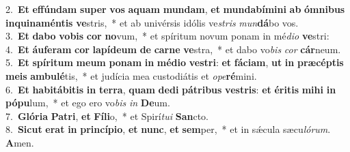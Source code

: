 {2.~}\textbf{Et} \textbf{ef}\textbf{fún}\textbf{dam} \textbf{su}\textbf{per} \textbf{vos} \textbf{a}\textbf{quam} \textbf{mun}\textbf{dam}, \textbf{et} \textbf{mun}\textbf{da}\textbf{bí}\textbf{mi}\textbf{ni} \textbf{ab} \textbf{óm}\textbf{ni}\textbf{bus} \textbf{in}\textbf{qui}\textbf{na}\textbf{mén}\textbf{tis} \textbf{ve}stris,~* et ab univérsis idólis ve\textit{stris} \textit{mun}\textbf{dá}bo vos.\\
{3.~}\textbf{Et} \textbf{da}\textbf{bo} \textbf{vo}\textbf{bis} \textbf{cor} \textbf{no}vum,~* et spíritum novum ponam in mé\textit{di}\textit{o} \textbf{ve}stri:\\
{4.~}\textbf{Et} \textbf{áu}\textbf{fe}\textbf{ram} \textbf{cor} \textbf{la}\textbf{pí}\textbf{de}\textbf{um} \textbf{de} \textbf{car}\textbf{ne} \textbf{ve}stra,~* et dabo vo\textit{bis} \textit{cor} \textbf{cár}neum.\\
{5.~}\textbf{Et} \textbf{spí}\textbf{ri}\textbf{tum} \textbf{me}\textbf{um} \textbf{po}\textbf{nam} \textbf{in} \textbf{mé}\textbf{di}\textbf{o} \textbf{ve}\textbf{stri}: \textbf{et} \textbf{fá}\textbf{ci}\textbf{am}, \textbf{ut} \textbf{in} \textbf{præ}\textbf{cép}\textbf{tis} \textbf{me}\textbf{is} \textbf{am}\textbf{bu}\textbf{lé}tis,~* et judícia mea custodiátis et \textit{o}\textit{pe}\textbf{ré}mini.\\
{6.~}\textbf{Et} \textbf{ha}\textbf{bi}\textbf{tá}\textbf{bi}\textbf{tis} \textbf{in} \textbf{ter}\textbf{ra}, \textbf{quam} \textbf{de}\textbf{di} \textbf{pá}\textbf{tri}\textbf{bus} \textbf{ve}\textbf{stris}: \textbf{et} \textbf{é}\textbf{ri}\textbf{tis} \textbf{mi}\textbf{hi} \textbf{in} \textbf{pó}\textbf{pu}lum,~* et ego ero vo\textit{bis} \textit{in} \textbf{De}um.\\
{7.~}\textbf{Gló}\textbf{ri}\textbf{a} \textbf{Pa}\textbf{tri}, \textbf{et} \textbf{Fí}\textbf{li}o,~* et Spirí\textit{tu}\textit{i} \textbf{San}cto.\\
{8.~}\textbf{Si}\textbf{cut} \textbf{e}\textbf{rat} \textbf{in} \textbf{prin}\textbf{cí}\textbf{pi}\textbf{o}, \textbf{et} \textbf{nunc}, \textbf{et} \textbf{sem}per,~* et in sǽcula sæcu\textit{ló}\textit{rum}. \textbf{A}men.\\

